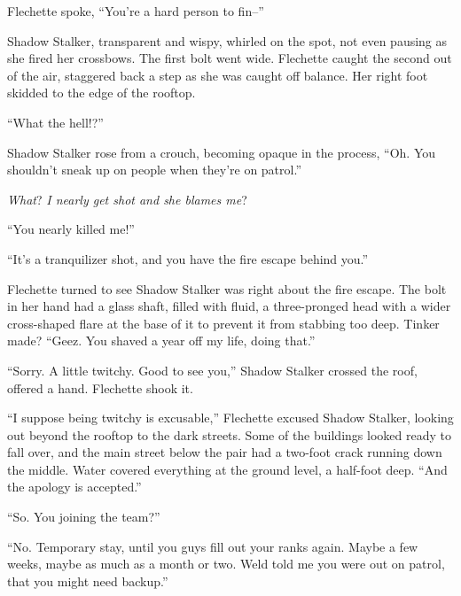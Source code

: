 





Flechette spoke, ``You're a hard person to fin--''



Shadow Stalker, transparent and wispy, whirled on the spot, not even pausing as she fired her crossbows.  The first bolt went wide.  Flechette caught the second out of the air, staggered back a step as she was caught off balance.  Her right foot skidded to the edge of the rooftop.



``What the hell!?''



Shadow Stalker rose from a crouch, becoming opaque in the process, ``Oh.  You shouldn't sneak up on people when they're on patrol.''



\emph{What}?  \emph{I nearly get shot and she blames me}?



``You nearly killed me!''



``It's a tranquilizer shot, and you have the fire escape behind you.''



Flechette turned to see Shadow Stalker was right about the fire escape.  The bolt in her hand had a glass shaft, filled with fluid, a three-pronged head with a wider cross-shaped flare at the base of it to prevent it from stabbing too deep.  Tinker made?  ``Geez.  You shaved a year off my life, doing that.''



``Sorry.  A little twitchy.  Good to see you,''  Shadow Stalker crossed the roof, offered a hand.  Flechette shook it.



``I suppose being twitchy is excusable,'' Flechette excused Shadow Stalker, looking out beyond the rooftop to the dark streets.  Some of the buildings looked ready to fall over, and the main street below the pair had a two-foot crack running down the middle.  Water covered everything at the ground level, a half-foot deep.  ``And the apology is accepted.''



``So.  You joining the team?''



``No.  Temporary stay, until you guys fill out your ranks again.  Maybe a few weeks, maybe as much as a month or two.  Weld told me you were out on patrol, that you might need backup.''




